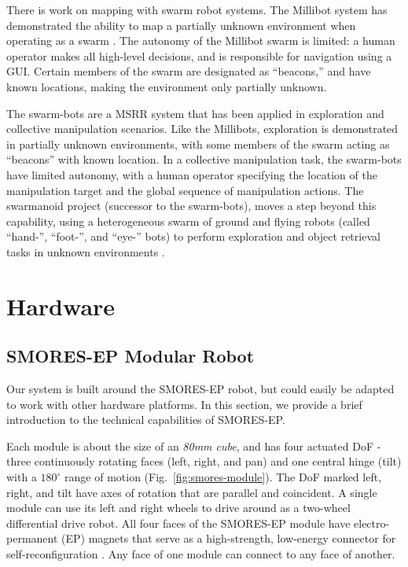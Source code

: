 \documentclass[conference]{IEEEtran}
\begin{document}
There is work on mapping with swarm robot systems. The Millibot system has demonstrated the ability to map a partially unknown environment when operating as a swarm \cite{Grabowski2000}. The autonomy of the Millibot swarm is limited: a human operator makes all high-level decisions, and is responsible for navigation using a GUI. Certain members of the swarm are designated as ``beacons,'' and have known locations, making the environment only partially unknown.

The swarm-bots are a MSRR system that has been applied in exploration \cite{Dorigo2005} and collective manipulation \cite{Mondada2005} scenarios.  Like the Millibots, exploration is demonstrated in partially unknown environments, with some members of the swarm acting as ``beacons'' with known location.  In a collective manipulation task, the swarm-bots have limited autonomy, with a human operator specifying the location of the manipulation target and the global sequence of manipulation actions. The swarmanoid project (successor to the swarm-bots), moves a step beyond this capability, using a heterogeneous swarm of ground and flying robots (called ``hand-'', ``foot-'', and ``eye-'' bots) to perform exploration and object retrieval tasks in unknown environments \cite{Dorigo2013}. 


\section{Hardware} %
\label{sec:hardware}
%
\subsection{SMORES-EP Modular Robot} \label{sec:smores}
%
Our system is built around the SMORES-EP robot, but could easily be adapted to
work with other hardware platforms.  In this section, we provide a brief
introduction to the technical capabilities of SMORES-EP.

Each module is about the size of an \textit{80mm cube}, and has four actuated DoF - three continuously rotating faces (left, right, and
pan)  and one central hinge (tilt) with a \(180^\circ\) range of motion
(Fig.~\ref{fig:smores-module}). The DoF marked left, right, and tilt  have
 axes of rotation that are parallel and coincident. A single module can use its
left and right wheels to drive around as a two-wheel differential drive robot.
All four faces of the SMORES-EP module have electro-permanent (EP) magnets
that serve as a high-strength, low-energy connector for self-reconfiguration
\cite{tosun2016design}.  Any face of one module can connect to any face of
another.
\end{document}
